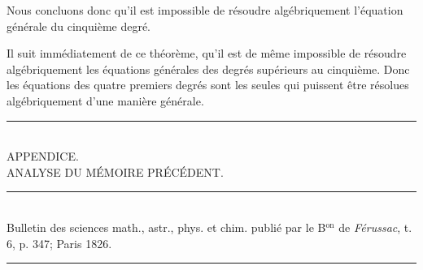 \documentclass[oneside, 12 pt, leqno]{memoir}
\begin{document}
Nous concluons donc qu’il est impossible de résoudre algébriquement l'équation générale du cinquième degré.

Il suit immédiatement de ce théorème, qu’il est de même impossible de résoudre algébriquement les équations générales des degrés supérieurs au cinquième. Donc les équations des quatre premiers degrés sont les seules qui puissent être résolues algébriquement d'une manière générale.

\begin{center} 
\rule{2in}{0.1pt}\\ [2\baselineskip]
{\large APPENDICE.\\ [\baselineskip]
ANALYSE DU MÉMOIRE PRÉCÉDENT.\\ [\baselineskip]}
\rule{2in}{0.1pt}\\ [0.5\baselineskip]
{\tiny Bulletin des sciences math., astr., phys. et chim. publié par le B\({}^{\text{on}}\) de \textit{Férussac}, t. 6, p. 347; Paris 1826.}\\
\rule{2in}{0.1pt}
\end{center}
\end{document}
